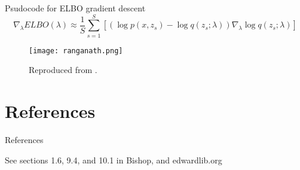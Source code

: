 \documentclass{beamer}
\begin{document}
\begin{frame}{Psudocode for ELBO gradient descent}
  \[\nabla_\lambda ELBO(\lambda) \approx \frac{1}{S} \sum_{s=1}^{S} \left[ \left( \log p(x, z_s) - \log q(z_s; \lambda)\right) \nabla_\lambda \log q(z_s; \lambda) \right]\]
  \begin{figure}
    \texttt{[image: ranganath.png]}
    \caption{Reproduced from \cite{ranganath2014}.}
  \end{figure}
\end{frame}

    
\section{References}
\begin{frame}{References}
  \begin{block}{See sections 1.6, 9.4, and 10.1 in Bishop, and edwardlib.org}
    \AtNextBibliography{\small}
    \printbibliography
  \end{block}
\end{frame}

\end{document}
